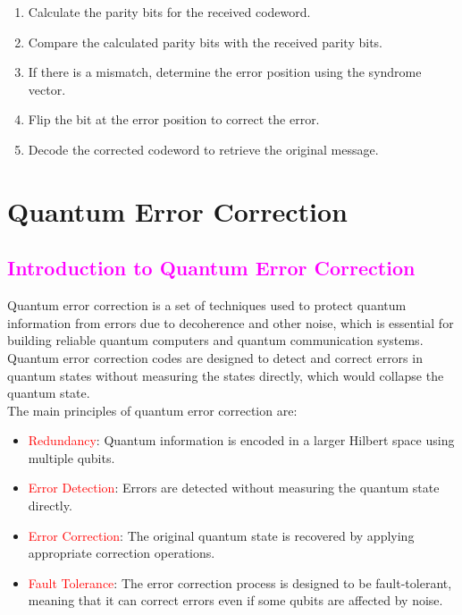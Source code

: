 \documentclass{book}
\begin{document}
\begin{enumerate}
    \item Calculate the parity bits for the received codeword.
    \item Compare the calculated parity bits with the received parity bits.
    \item If there is a mismatch, determine the error position using the syndrome vector.
    \item Flip the bit at the error position to correct the error.
    \item Decode the corrected codeword to retrieve the original message.
\end{enumerate}







\chapter{Quantum Error Correction}
\textcolor{magenta}{\section{\textbf{Introduction to Quantum Error Correction}}}
Quantum error correction is a set of techniques used to protect quantum information from errors due to decoherence and other noise, which is essential for building reliable quantum computers and quantum communication systems.\\
\vspace{2mm}
Quantum error correction codes are designed to detect and correct errors in quantum states without measuring the states directly, which would collapse the quantum state.\\
\vspace{2mm}
The main principles of quantum error correction are:
\begin{itemize}
    \item \textcolor{red}{Redundancy}: Quantum information is encoded in a larger Hilbert space using multiple qubits.
    \item \textcolor{red}{Error Detection}: Errors are detected without measuring the quantum state directly.
    \item \textcolor{red}{Error Correction}: The original quantum state is recovered by applying appropriate correction operations.
    \item \textcolor{red}{Fault Tolerance}: The error correction process is designed to be fault-tolerant, meaning that it can correct errors even if some qubits are affected by noise.
\end{itemize}
\end{document}
